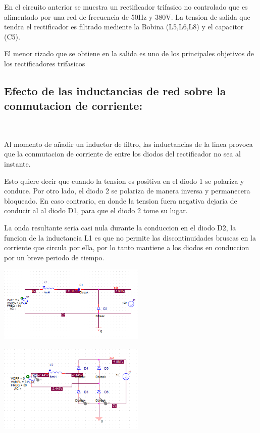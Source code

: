 \documentclass[12pt,letterpaper]{article}
\begin{document}
En el circuito anterior se muestra un rectificador trifasico no controlado que es alimentado por una red de frecuencia de 50Hz y 380V. La tension de salida que tendra el rectificador es filtrado mediente la Bobina (L5,L6,L8) y el capacitor (C5).
\

El menor rizado que se obtiene en la salida es uno de los principales objetivos de los rectificadores trifasicos
\

\subsection{Efecto de las inductancias de red sobre la conmutacion de corriente: }
\

Al momento de añadir un inductor de filtro, las inductancias de la linea provoca que la conmutacion de corriente de entre los diodos del rectificador no sea al instante.
\

Esto quiere decir que cuando la tension es positiva en el diodo 1 se polariza y conduce. Por otro lado, el diodo 2 se polariza de manera inversa y permanecera bloqueado. En caso contrario, en donde la tension fuera negativa dejaria de conducir al al diodo D1, para que el diodo 2 tome su lugar.
\

La onda resultante seria casi nula durante la conduccion en el diodo D2, la funcion de la inductancia L1 es que no permite las discontinuidades bruscas en la corriente que circula por ella, por lo tanto mantiene a los diodos en conduccion por un breve periodo de tiempo.
\

\includegraphics[width=7cm]{Circuito 1-7-1.png}
\

\includegraphics[width=7cm]{Circuito 1-7.png} 
\
\end{document}
